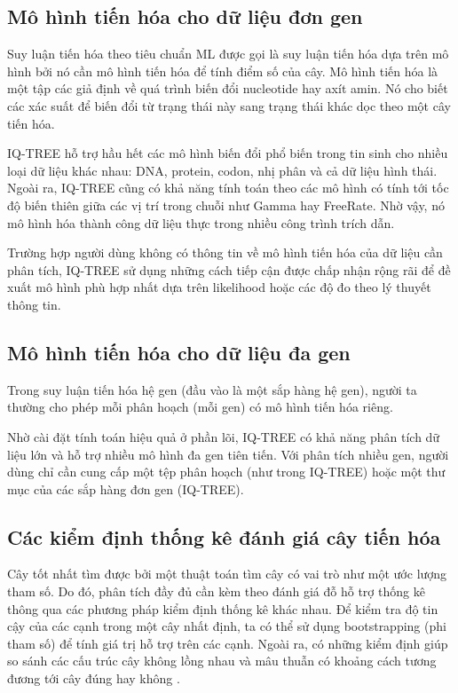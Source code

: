 \documentclass[12pt]{report}
\begin{document}
\subsection{Mô hình tiến hóa cho dữ liệu đơn gen}
Suy luận tiến hóa theo tiêu chuẩn ML được gọi là suy luận tiến hóa dựa trên mô hình bởi nó cần mô hình tiến hóa để tính điểm số của cây. Mô hình tiến hóa là một tập các giả định về quá trình biến đổi nucleotide hay axít amin. Nó cho biết các xác suất để biến đổi từ trạng thái này sang trạng thái khác dọc theo một cây tiến hóa.

IQ-TREE hỗ trợ hầu hết các mô hình biến đổi phổ biến trong tin sinh cho nhiều loại dữ liệu khác nhau: DNA, protein, codon, nhị phân và cả dữ liệu hình thái. Ngoài ra, IQ-TREE cũng có khả năng tính toán theo các mô hình có tính tới tốc độ biến thiên giữa các vị trí trong chuỗi như Gamma hay FreeRate. Nhờ vậy, nó mô hình hóa thành công dữ liệu thực trong nhiều công trình trích dẫn.

Trường hợp người dùng không có thông tin về mô hình tiến hóa của dữ liệu cần phân tích, IQ-TREE sử dụng những cách tiếp cận được chấp nhận rộng rãi để đề xuất mô hình phù hợp nhất dựa trên likelihood hoặc các độ đo theo lý thuyết thông tin.
\subsection{Mô hình tiến hóa cho dữ liệu đa gen}
Trong suy luận tiến hóa hệ gen (đầu vào là một sắp hàng hệ gen), người ta thường cho phép mỗi phân hoạch (mỗi gen) có mô hình tiến hóa riêng.

Nhờ cài đặt tính toán hiệu quả ở phần lõi, IQ-TREE có khả năng phân tích dữ liệu lớn và hỗ trợ nhiều mô hình đa gen tiên tiến. Với phân tích nhiều gen, người dùng chỉ cần cung cấp một tệp phân hoạch (như trong IQ-TREE) hoặc một thư mục của các sắp hàng đơn gen (IQ-TREE).
\subsection{Các kiểm định thống kê đánh giá cây tiến hóa}
Cây tốt nhất tìm được bởi một thuật toán tìm cây có vai trò như một ước lượng tham số. Do đó, phân tích đầy đủ cần kèm theo đánh giá đỗ hỗ trợ thống kê thông qua các phương pháp kiểm định thống kê khác nhau. Để kiểm tra độ tin cậy của các cạnh trong một cây nhất định, ta có thể sử dụng bootstrapping (phi tham số) để tính giá trị hỗ trợ trên các cạnh. Ngoài ra, có những kiểm định giúp so sánh các cấu trúc cây không lồng nhau và mâu thuẫn có khoảng cách tương đương tới cây đúng hay không .
\end{document}
